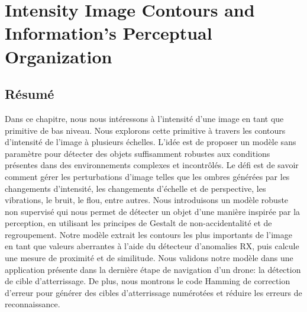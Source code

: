 \chapter{Intensity Image Contours and Information's Perceptual Organization} \label{ch:landing_target_detection}
%

\section*{Résumé}
\noindent Dans ce chapitre, nous nous intéressons à l'intensité d'une image en tant que primitive de bas niveau. Nous explorons cette primitive à travers les contours d'intensité de l'image à plusieurs échelles. L'idée est de proposer un modèle sans paramètre pour détecter des objets suffisamment robustes aux conditions présentes dans des environnements complexes et incontrôlés. Le défi est de savoir comment gérer les perturbations d'image telles que les ombres générées par les changements d'intensité, les changements d'échelle et de perspective, les vibrations, le bruit, le flou, entre autres. Nous introduisons un modèle robuste non supervisé qui nous permet de détecter un objet d'une manière inspirée par la perception, en utilisant les principes de Gestalt de non-accidentalité et de regroupement. Notre modèle extrait les contours les plus importants de l'image en tant que valeurs aberrantes à l'aide du détecteur d'anomalies RX, puis calcule une mesure de proximité et de similitude. Nous validons notre modèle dans une application présente dans la dernière étape de navigation d'un drone: la détection de cible d'atterrissage. De plus, nous montrons le code Hamming de correction d'erreur pour générer des cibles d'atterrissage numérotées et réduire les erreurs de reconnaissance.


